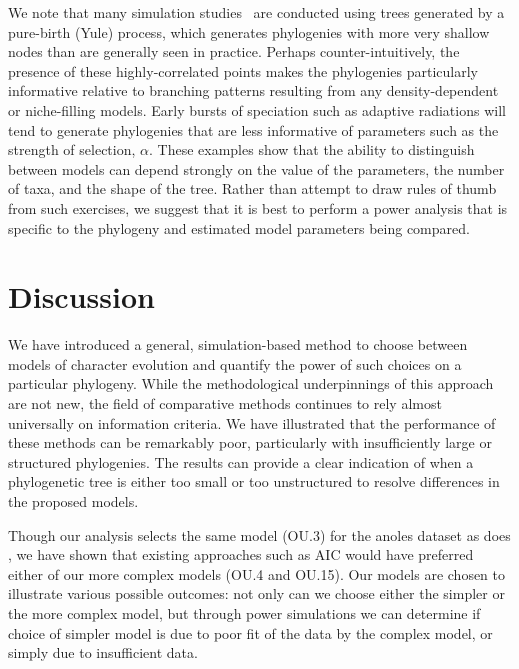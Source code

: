 We note that many simulation studies~\citep[\emph{e.g.}][]{Freckleton2002}
are conducted using trees generated by a pure-birth (Yule) process, which generates phylogenies 
with more very shallow nodes than are generally seen in practice.
Perhaps counter-intuitively, the presence of these highly-correlated points makes the phylogenies particularly informative
relative to branching patterns resulting from any density-dependent or niche-filling models. %
Early bursts of speciation such as adaptive radiations 
will tend to generate phylogenies that are less informative of parameters such as the strength of selection, $\alpha$.  
These examples show that the ability to distinguish between models can depend strongly on the value of the parameters, 
the number of taxa, and the shape of the tree.  
Rather than attempt to draw rules of thumb from such exercises, 
we suggest that it is best to perform a power analysis that is specific to the phylogeny and estimated model parameters being compared.  







\section{Discussion}
We have introduced a general, simulation-based method to choose between models of character evolution and quantify the power of such choices on a particular phylogeny.
While the methodological underpinnings of this approach are not new, the field of comparative methods continues to rely almost universally on information criteria.  We have illustrated that the performance of these methods can be remarkably poor, particularly with insufficiently large or structured phylogenies.  The results can provide a clear indication of when a phylogenetic tree is either too small or too unstructured to resolve differences in the proposed models.  

Though our analysis selects the same model (OU.3) for the anoles dataset as does \citet{Butler2004},
we have shown that existing approaches such as AIC \citet[as used in][]{Butler2004}
would have preferred either of our more complex models (OU.4 and OU.15).
Our models are chosen to illustrate various possible outcomes:
not only can we choose either the simpler or the more complex model, 
but through power simulations we can determine if choice of simpler model 
is due to poor fit of the data by the complex model, 
or simply due to insufficient data.



